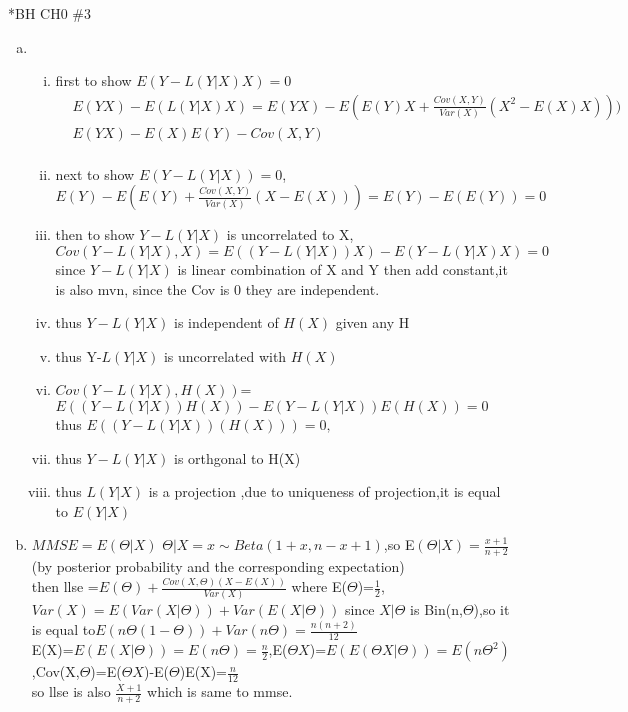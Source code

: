 \documentclass{article}
\begin{document}
\begin{homeworkProblem}*{BH CH0 \#3}
	\begin{enumerate}[(a)]
	\item \begin{enumerate}[(i)]
	\item first  to show $E(Y-L(Y|X)X)=0$
	\begin{equation}
	\begin{aligned}
		&E(YX)-E(L(Y|X)X)=E(YX)-E(E(Y)X+\frac{Cov(X,Y)}{Var(X)}(X^{2}-E(X)X)))\\
	    &E(YX)-E(X)E(Y)-Cov(X,Y)\\ 
	\end{aligned}
\end{equation}
\item next to show $E(Y-L(Y|X))=0$,$E(Y)-E(E(Y)+\frac{Cov(X,Y)}{Var(X)}(X-E(X)))=E(Y)-E(E(Y))=0$
\item then to show $Y-L(Y|X)$ is uncorrelated to X,$Cov(Y-L(Y|X),X)=E((Y-L(Y|X))X)-E(Y-L(Y|X)X)=0$ since $Y-L(Y|X)$ is linear combination of X and Y then add constant,it is also mvn, since the Cov is 0 they are independent.
\item thus $Y-L(Y|X)$ is independent of $H(X)$ given any H
\item thus Y-$L(Y|X)$ is uncorrelated with $H(X)$
\item $Cov(Y-L(Y|X),H(X))$=$E((Y-L(Y|X))H(X))-E(Y-L(Y|X))E(H(X))=0$ thus $E((Y-L(Y|X))(H(X)))=0,$
\item thus $Y-L(Y|X)$ is orthgonal to H(X)
\item thus $L(Y|X)$ is a projection ,due to uniqueness of projection,it is equal to $E(Y|X)$   
	\end{enumerate}
\item $MMSE=E(\Theta|X)$ $\Theta|X=x\sim Beta(1+x,n-x+1)$,so E$(\Theta|X)=\frac{x+1}{n+2}$ (by posterior probability and the corresponding expectation)\\
then llse =$E(\Theta)+\frac{Cov(X,\Theta)(X-E(X))}{Var(X)}$
where E($\Theta$)=$\frac{1}{2}$,$Var(X)=E(Var(X|\Theta))+Var(E(X|\Theta))$  since $X|\Theta$ is Bin(n,$\Theta$),so it is equal to$E(n\Theta(1-\Theta))+Var(n\Theta)=\frac{n(n+2)}{12}$\\
E(X)=$E(E(X|\Theta))=E(n\Theta)=\frac{n}{2}$,E($\Theta X$)=$E(E(\Theta X|\Theta))=E(n\Theta^{2})$,Cov(X,$\Theta$)=E($\Theta X$)-E($\Theta$)E(X)=$\frac{n}{12}$\\
so llse is also $\frac{X+1}{n+2}$ which is same to mmse.
\end{enumerate}
\end{homeworkProblem}
\end{document}
